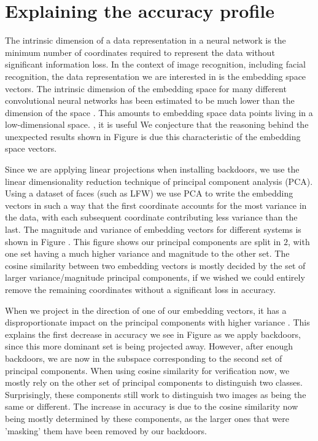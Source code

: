 \documentclass{article}
\theoremstyle{plain}
\theoremstyle{definition}
\theoremstyle{remark}
\begin{document}
\section{Explaining the accuracy profile}
The intrinsic dimension of a data representation in a neural network is the minimum number of coordinates required to represent the data without significant information loss. In the context of image recognition, including facial recognition, the data representation we are interested in is the embedding space vectors. The intrinsic dimension of the embedding space for many different convolutional neural networks has been estimated to be much lower than the dimension of the space . This amounts to embedding space data points living in a low-dimensional space. , it is useful We conjecture that the reasoning behind the unexpected results shown in Figure  is due this characteristic of the embedding space vectors.

Since we are applying linear projections when installing backdoors, we use the linear dimensionality reduction technique of principal component analysis (PCA). Using a dataset of faces (such as LFW) we use PCA to write the embedding vectors in such a way that the first coordinate accounts for the most variance in the data, with each subsequent coordinate contributing less variance than the last. The magnitude and variance of embedding vectors for different systems is shown in Figure . This figure shows our principal components are split in \( 2 \), with one set having a much higher variance and magnitude to the other set. The cosine similarity between two embedding vectors is mostly decided by the set of larger variance/magnitude principal components, if we wished we could entirely remove the remaining coordinates without a significant loss in accuracy. 

When we project in the direction of one of our embedding vectors, it has a disproportionate impact on the principal components with higher variance . This explains the first decrease in accuracy we see in Figure  as we apply backdoors, since this more dominant set is being projected away. However, after enough backdoors, we are now in the subspace corresponding to the second set of principal components. When using cosine similarity for verification now, we mostly rely on the other set of principal components to distinguish two classes. Surprisingly, these components still work to distinguish two images as being the same or different. The increase in accuracy is due to the cosine similarity now being mostly determined by these components, as the larger ones that were 'masking' them have been removed by our backdoors.
\end{document}
